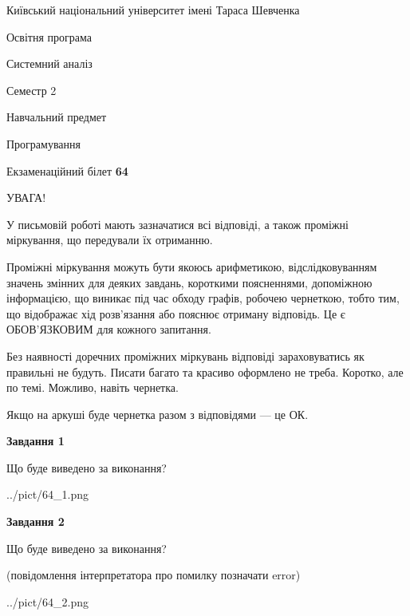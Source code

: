 \documentclass[12pt, ukrainian]{article}
\begin{document}
{{\begin {small}\par
{ \center  Київський національний університет імені Тараса Шевченка \par}
{\parbox {5 cm}{Освітня програма \hfill}{\parbox {7 cm}{Системний аналіз \hfill}}\parbox {6 cm}{\hfill Семестр 2}}\par
{\parbox {5 cm} {Навчальний предмет \hfill}\parbox {7 cm}{Програмування \hfill}\parbox {6cm}{\hfill}\par}\vspace{-7pt} \end{small}}{\center Екзаменаційний білет \No \textbf
{ 64 }\par}}
{
\begin {large}
УВАГА!

У письмовій роботі мають зазначатися всі відповіді, а також проміжні міркування, що передували їх отриманню.

Проміжні міркування можуть бути якоюсь арифметикою, відслідковуванням зна\-чень змінних для деяких завдань,
короткими поясненнями, допоміжною інформацією, що виникає під час обходу графів, робочею чернеткою,
тобто тим, що відображає хід розв’язання або пояснює отриману відповідь.
Це є ОБОВ’ЯЗКОВИМ для кожного запитання.

Без наявності доречних проміжних міркувань відповіді зараховуватись як правиль\-ні не будуть.
Писати багато та красиво оформлено не треба. Коротко, але по темі. Можли\-во, навіть чернетка.

Якщо на аркуші буде чернетка разом з відповідями --- це ОК.

\newpage

{\begin {center}\textbf{Завдання 1}\end {center}}\par
Що буде виведено за виконання?\par
\begin{center}
	{../pict/64_1.png}
\end{center}
\newpage

{\begin {center}\textbf{Завдання 2}\end {center}}\par
Що буде виведено за виконання?\par
 (повідомлення інтерпретатора про помилку позначати error)\par
\begin{center}
	{../pict/64_2.png}
\end{center}
\newpage


\end{large}}
\end{document}
